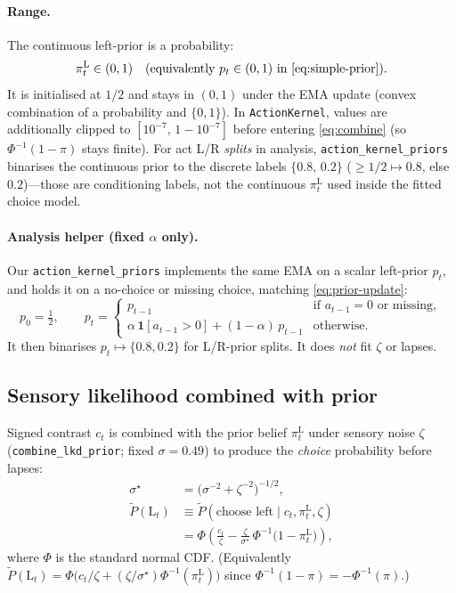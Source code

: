 \documentclass[11pt]{article}
\begin{document}
\paragraph{Range.}
The continuous left-prior is a probability:
\[
\pi_t^{\mathrm{L}}\in(0,1)
\quad\text{(equivalently }p_t\in(0,1)\text{ in \eqref{eq:simple-prior})}.
\]
It is initialised at \(1/2\) and stays in \((0,1)\) under the EMA update
(convex combination of a probability and \(\{0,1\}\)).
In \texttt{ActionKernel}, values are additionally clipped to
\([10^{-7},\,1-10^{-7}]\) before entering \eqref{eq:combine}
(so \(\Phi^{-1}(1-\pi)\) stays finite).
For act L/R \emph{splits} in analysis, \texttt{action\_kernel\_priors}
binarises the continuous prior to the discrete labels
\(\{0.8,\,0.2\}\) (\(\ge 1/2\mapsto 0.8\), else \(0.2\))---those are
conditioning labels, not the continuous \(\pi_t^{\mathrm{L}}\) used inside
the fitted choice model.

\paragraph{Analysis helper (fixed \(\alpha\) only).}
Our \texttt{action\_kernel\_priors} implements the same EMA on a scalar
left-prior \(p_t\), and holds it on a no-choice or missing choice,
matching \eqref{eq:prior-update}:
\begin{equation}
\label{eq:simple-prior}
p_0 = \tfrac12,\qquad
p_t =
\begin{cases}
p_{t-1} & \text{if } a_{t-1}=0 \text{ or missing},\\
\alpha\,\mathbf{1}[a_{t-1}>0] + (1-\alpha)\,p_{t-1} & \text{otherwise.}
\end{cases}
\end{equation}
It then binarises \(p_t\mapsto\{0.8,0.2\}\) for L/R-prior splits.
It does \emph{not} fit \(\zeta\) or lapses.

\subsection{Sensory likelihood combined with prior}

Signed contrast \(c_t\) is combined with the prior belief
\(\pi_t^{\mathrm{L}}\) under sensory noise \(\zeta\)
(\texttt{combine\_lkd\_prior}; fixed \(\sigma=0.49\))
to produce the \emph{choice} probability before lapses:
\begin{equation}
\label{eq:combine}
\begin{aligned}
\sigma^\star
&=
\bigl(\sigma^{-2}+\zeta^{-2}\bigr)^{-1/2},
\\
\tilde P(\mathrm{L}_t)
&\equiv
\tilde P(\text{choose left}\mid c_t,\pi_t^{\mathrm{L}},\zeta)
\\
&=
\Phi\!\left(
\frac{c_t}{\zeta}
-
\frac{\zeta}{\sigma^\star}\,
\Phi^{-1}\!\bigl(1-\pi_t^{\mathrm{L}}\bigr)
\right),
\end{aligned}
\end{equation}
where \(\Phi\) is the standard normal CDF.
(Equivalently
\(\tilde P(\mathrm{L}_t)
=\Phi\bigl(c_t/\zeta+(\zeta/\sigma^\star)\Phi^{-1}(\pi_t^{\mathrm{L}})\bigr)\)
since \(\Phi^{-1}(1-\pi)=-\Phi^{-1}(\pi)\).)
\end{document}
